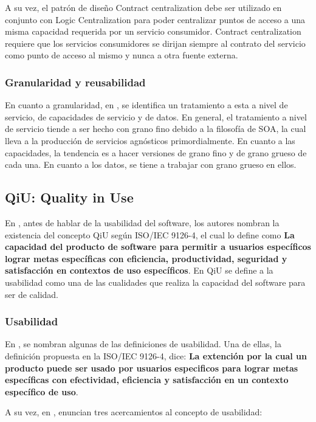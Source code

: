 A su vez, el patrón de diseño Contract centralization debe ser utilizado en conjunto con Logic Centralization para poder centralizar puntos de acceso a una misma capacidad requerida por un servicio consumidor. Contract centralization requiere que los servicios consumidores se dirijan siempre al contrato del servicio como punto de acceso al mismo y nunca a otra fuente externa.

\subsubsection{Granularidad y reusabilidad}

En cuanto a granularidad, en \cite{soa_principles}, se identifica un tratamiento a esta a nivel de servicio, de capacidades de servicio y de datos. En general, el tratamiento a nivel de servicio tiende a ser hecho con grano fino debido a la filosofía de SOA, la cual lleva a la producción de servicios agnósticos primordialmente. En cuanto a las capacidades, la tendencia es a hacer versiones de grano fino y de grano grueso de cada una. En cuanto a los datos, se tiene a trabajar con grano grueso en ellos.

\subsection{QiU: Quality in Use}

En \cite{quality_in_use}, antes de hablar de la usabilidad del software, los autores nombran la existencia del concepto QiU según ISO/IEC 9126-4, el cual lo define como \textbf{La capacidad del producto de software para permitir a usuarios específicos lograr metas específicas con eficiencia, productividad, seguridad y satisfacción en contextos de uso específicos}. En QiU se define a la usabilidad como una de las cualidades que realiza la capacidad del software para ser de calidad.

\subsubsection{Usabilidad}

En \cite{quality_in_use}, se nombran algunas de las definiciones de usabilidad. Una de ellas, la definición propuesta en la ISO/IEC 9126-4, dice: \textbf{La extención por la cual un producto puede ser usado por usuarios especificos para lograr metas específicas con efectividad, eficiencia y satisfacción en un contexto específico de uso}.

A su vez, en \cite{quality_in_use}, enuncian tres acercamientos al concepto de usabilidad:

